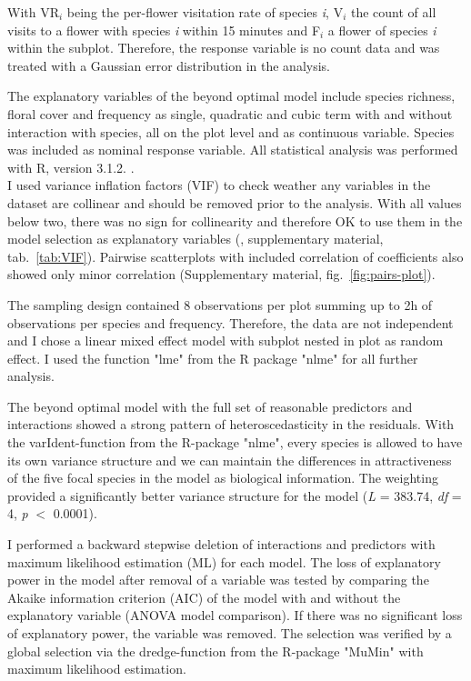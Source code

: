 With VR$_{\textit{i}}$ being the per-flower visitation rate of species \textit{i}, 
V$_{\textit{i}}$ the count of all visits to a flower with species \textit{i} within 15 minutes and F$_{\textit{i}}$ a flower of species \textit{i} within the subplot. Therefore, the response variable is no count data and was treated with a Gaussian error distribution in the analysis.

The explanatory variables of the beyond optimal model include species richness, floral cover and frequency as single, quadratic and cubic term with and without interaction with species, all on the plot level and as continuous variable. Species was included as nominal response variable. All statistical analysis was performed with R, version 3.1.2. \citep{R}. \\

I used variance inflation factors (VIF) to check weather any variables in the dataset are collinear and should be removed prior to the analysis. With all values below two, there was no sign for collinearity and therefore OK to use them in the model selection as explanatory variables (\citealt{zuur2007analysing}, supplementary material, tab.~\ref{tab:VIF}). Pairwise scatterplots with included correlation of coefficients also showed only minor correlation (Supplementary material, fig.~\ref{fig:pairs-plot}).

The sampling design contained 8 observations per plot summing up to 2h of observations per species and frequency. Therefore, the data are not independent and I chose a linear mixed effect model with subplot nested in plot as random effect. I used the function "lme" from the R package "nlme" \citep{Rnlme} for all further analysis.

The beyond optimal model with the full set of reasonable predictors and interactions showed a strong pattern of heteroscedasticity in the residuals. With the varIdent-function from the R-package "nlme", every species is allowed to have its own variance structure and we can maintain the differences in attractiveness of the five focal species in the model as biological information. The weighting provided a significantly better variance structure for the model (\textit{L} = 383.74, \textit{df} = 4, \textit{p} $<$ 0.0001).

I performed a backward stepwise deletion of interactions and predictors with maximum likelihood estimation (ML) for each model. The loss of explanatory power in the model after removal of a variable was tested by comparing the Akaike information criterion (AIC) of the model with and without the explanatory variable (ANOVA model comparison). If there was no significant loss of explanatory power, the variable was removed. The selection was verified by a global selection via the dredge-function from the R-package "MuMin" \citep{MuMIn} with maximum likelihood estimation. 

